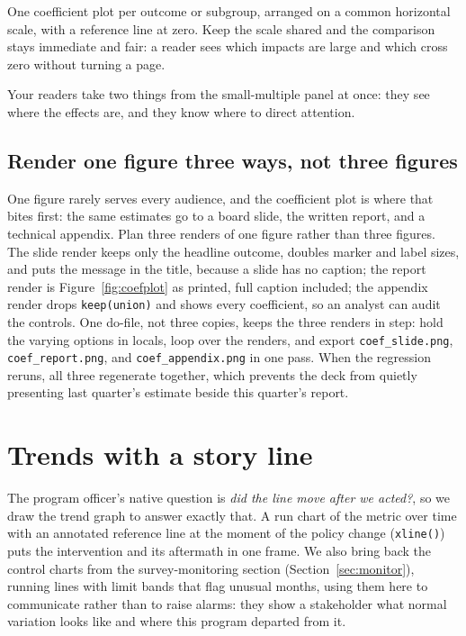 \documentclass[
    a4paper,
    fontsize=10pt,
    twoside=true,
    numbers=noenddot,
]{kaobook}
\newenvironment{vizcallout}[1][Visualization to build]{%
    \begin{vizbox}[frametitle={#1}]%
}{%
    \end{vizbox}%
}
\begin{document}
\begin{vizcallout}[Visualization to build: the small-multiple coefficient plot]
One coefficient plot per outcome or subgroup, arranged on a common horizontal scale, with a reference line at zero. Keep the scale shared and the comparison stays immediate and fair: a reader sees which impacts are large and which cross zero without turning a page.
\end{vizcallout}

Your readers take two things from the small-multiple panel at once: they see where the effects are, and they know where to direct attention.

\subsection{Render one figure three ways, not three figures}\label{ch09-sc-renders}
One figure rarely serves every audience, and the coefficient plot is where that bites first: the same estimates go to a board slide, the written report, and a technical appendix. Plan three renders of one figure rather than three figures. The slide render keeps only the headline outcome, doubles marker and label sizes, and puts the message in the title, because a slide has no caption; the report render is Figure~\ref{fig:coefplot} as printed, full caption included; the appendix render drops \texttt{keep(union)} and shows every coefficient, so an analyst can audit the controls. One do-file, not three copies, keeps the three renders in step: hold the varying options in locals, loop over the renders, and export \texttt{coef\_slide.png}, \texttt{coef\_report.png}, and \texttt{coef\_appendix.png} in one pass. When the regression reruns, all three regenerate together, which prevents the deck from quietly presenting last quarter's estimate beside this quarter's report.

\section{Trends with a story line}
The program officer's native question is \emph{did the line move after we acted?}, so we draw the trend graph to answer exactly that. A run chart of the metric over time with an annotated reference line at the moment of the policy change (\texttt{xline()}) puts the intervention and its aftermath in one frame. We also bring back the control charts from the survey-monitoring section (Section~\ref{sec:monitor}), running lines with limit bands that flag unusual months, using them here to communicate rather than to raise alarms: they show a stakeholder what normal variation looks like and where this program departed from it.
\end{document}
